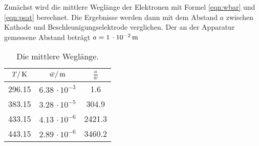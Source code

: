 Zunächst wird die mittlere Weglänge der Elektronen mit Formel \eqref{eqn:wbar}
und \eqref{eqn:psat} berechnet. Die Ergebnisse werden dann mit dem Abstand $a$
zwischen Kathode und Beschleunigungselektrode verglichen. Der an der Apparatur
gemessene Abstand beträgt $a=1\,\cdot10^{-2}\,\si{\meter}$
\begin{table}
  \centering
  \begin{tabular}{ccc}
    \toprule
    $T/\,\si{\kelvin}$ & $\bar w/\,\si{\meter}$ & $\frac{a}{\bar w}$ \\
    \midrule
     296.15 & $6.38\,\cdot 10^{-3}$ &    1.6  \\
     383.15 & $3.28\,\cdot 10^{-5}$ &  304.9  \\
     433.15 & $4.13\,\cdot 10^{-6}$ & 2421.3  \\
     443.15 & $2.89\,\cdot 10^{-6}$ & 3460.2  \\
    \bottomrule
  \end{tabular}
  \caption{Die mittlere Weglänge.}
  \label{tab:weg}
\end{table}

